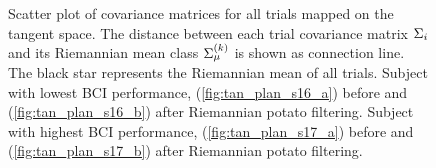 \begin{figure}[hb!]
\begin{adjustbox}{center}
\end{adjustbox}
\caption{Scatter plot of covariance matrices for all trials mapped on the tangent space. The distance between each trial covariance matrix $\Sigma_{i}$ and its Riemannian mean class $\Sigma_{\mu}^{(k)}$ is shown as connection line. The black star represents the Riemannian mean of all trials. %
Subject with lowest BCI performance, (\ref{fig:tan_plan_s16_a}) before and (\ref{fig:tan_plan_s16_b}) after Riemannian potato filtering. 
Subject with highest BCI performance, (\ref{fig:tan_plan_s17_a}) before and (\ref{fig:tan_plan_s17_b}) after Riemannian potato filtering.}
\label{fig:tan_plan_s16&17}
\end{figure} 


